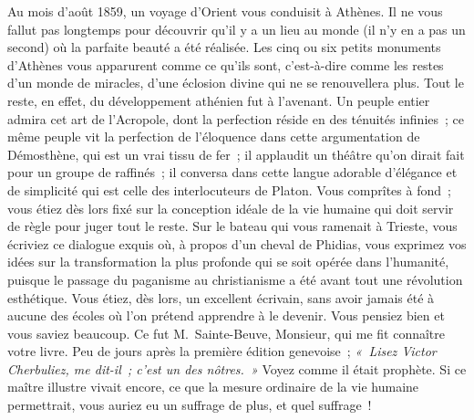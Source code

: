 \documentclass[french,twoside]{book} %
\newcommand\orgName[1]{#1}
\newcommand\persName[1]{#1}
\newcommand\placeName[1]{#1}
\begin{document}
Au mois d’août 1859, un voyage d’{\placeName Orient} vous conduisit à {\placeName Athènes}. Il ne vous fallut pas longtemps pour découvrir qu’il y a un lieu au monde (il n’y en a pas un second) où la parfaite beauté a été réalisée. Les cinq ou six petits monuments d’{\placeName Athènes} vous apparurent comme ce qu’ils sont, c’est-à-dire comme les restes d’un monde de miracles, d’une éclosion divine qui ne se renouvellera plus. Tout le reste, en effet, du développement athénien fut à l’avenant. Un peuple entier admira cet art de l’{\orgName Acropole}, dont la perfection réside en des ténuités infinies ; ce même peuple vit la perfection de l’éloquence dans cette argumentation de {\persName Démosthène}, qui est un vrai tissu de fer ; il applaudit un théâtre qu’on dirait fait pour un groupe de raffinés ; il conversa dans cette langue adorable d’élégance et de simplicité qui est celle des interlocuteurs de {\persName Platon}. Vous comprîtes à fond ; vous étiez dès lors fixé sur la conception idéale de la vie humaine qui doit servir de règle pour juger tout le reste. Sur le bateau qui vous ramenait à {\placeName Trieste}, vous écriviez ce dialogue exquis où, à propos d’un cheval de {\persName Phidias}, vous exprimez vos idées sur la transformation la plus profonde qui se soit opérée dans l’humanité, puisque le passage du paganisme au christianisme a été avant tout une révolution esthétique. Vous étiez, dès lors, un excellent écrivain, sans avoir jamais été à aucune des écoles où l’on prétend apprendre à le devenir. Vous pensiez bien et vous saviez beaucoup. Ce fut {\persName M. Sainte-Beuve}, Monsieur, qui me fit connaître votre livre. Peu de jours après la première édition genevoise ; \emph{« Lisez {\persName Victor Cherbuliez}, me dit-il ; c’est un des nôtres. »} Voyez comme il était prophète. Si ce maître illustre vivait encore, ce que la mesure ordinaire de la vie humaine permettrait, vous auriez eu un suffrage de plus, et quel suffrage !\par
\end{document}
